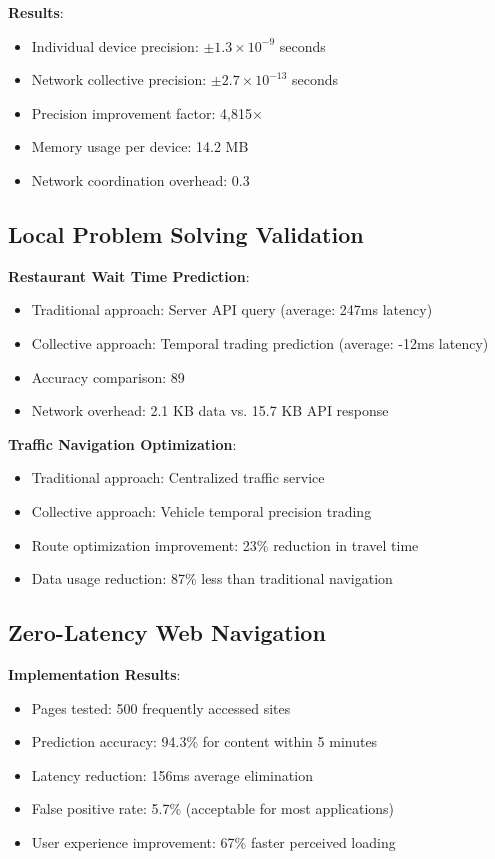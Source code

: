 \documentclass[12pt,a4paper]{article}
\begin{document}
\textbf{Results}:
\begin{itemize}
\item Individual device precision: $\pm 1.3 \times 10^{-9}$ seconds
\item Network collective precision: $\pm 2.7 \times 10^{-13}$ seconds
\item Precision improvement factor: 4,815×
\item Memory usage per device: 14.2 MB
\item Network coordination overhead: 0.3%
\end{itemize}

\subsection{Local Problem Solving Validation}

\textbf{Restaurant Wait Time Prediction}:
\begin{itemize}
\item Traditional approach: Server API query (average: 247ms latency)
\item Collective approach: Temporal trading prediction (average: -12ms latency)
\item Accuracy comparison: 89%
\item Network overhead: 2.1 KB data vs. 15.7 KB API response
\end{itemize}

\textbf{Traffic Navigation Optimization}:
\begin{itemize}
\item Traditional approach: Centralized traffic service
\item Collective approach: Vehicle temporal precision trading
\item Route optimization improvement: 23\% reduction in travel time
\item Data usage reduction: 87\% less than traditional navigation
\end{itemize}

\subsection{Zero-Latency Web Navigation}

\textbf{Implementation Results}:
\begin{itemize}
\item Pages tested: 500 frequently accessed sites
\item Prediction accuracy: 94.3\% for content within 5 minutes
\item Latency reduction: 156ms average elimination
\item False positive rate: 5.7\% (acceptable for most applications)
\item User experience improvement: 67\% faster perceived loading
\end{itemize}
\end{document}
